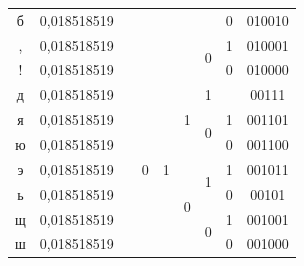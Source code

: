 \documentclass[a4paper,14pt]{extarticle}
\begin{document}
\begin{center}
\begin{tabular}{|c|c|c|c|c|c|c|c|c|}
        \cline{1-2} \cline{8-9}
        б                       & 0,018518519                  &                             &                      &                    &                    &                    & 0  & 010010 \\
        \cline{1-2} \cline{7-9}
        ,                       & 0,018518519                  &                             &                      &                    &                    & \multirow{2}{*}{0} & 1  & 010001 \\
        \cline{1-2} \cline{8-9}
        !                       & 0,018518519                  &                             &                      &                    &                    &                    & 0  & 010000 \\
        \cline{1-2} \cline{4-9}
        д                       & 0,018518519                  &                             & \multirow{15}{*}{0}  & \multirow{7}{*}{1} & \multirow{3}{*}{1} & 1                  &    & 00111  \\
        \cline{1-2} \cline{7-9}
        я                       & 0,018518519                  &                             &                      &                    &                    & \multirow{2}{*}{0} & 1  & 001101 \\
        \cline{1-2} \cline{8-9}
        ю                       & 0,018518519                  &                             &                      &                    &                    &                    & 0  & 001100 \\
        \cline{1-2} \cline{6-9}
        э                       & 0,018518519                  &                             &                      &                    & \multirow{4}{*}{0} & \multirow{2}{*}{1} & 1  & 001011 \\
        \cline{1-2} \cline{8-9}
        ь                       & 0,018518519                  &                             &                      &                    &                    &                    & 0  & 00101  \\
        \cline{1-2} \cline{7-9}
        щ                       & 0,018518519                  &                             &                      &                    &                    & \multirow{2}{*}{0} & 1  & 001001 \\
        \cline{1-2} \cline{8-9}
        ш                       & 0,018518519                  &                             &                      &                    &                    &                    & 0  & 001000 \\

\end{tabular}
\end{center}
\end{document}
